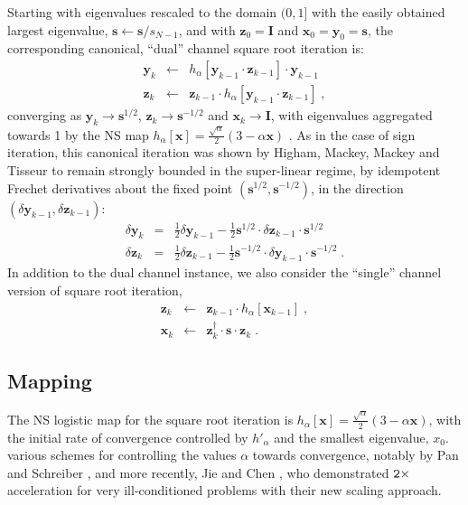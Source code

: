 \documentclass[letterpaper,twocolumn,amsmath,amsfont,amssymb,english,aps,jcp,preprintnumbers,groupaddress,nofootinbib,tightenlines,floatfix]{revtex4}
\newcommand{\mat}[1]{\boldsymbol{#1}}
\theoremstyle{plain}
\theoremstyle{remark}
\theoremstyle{plain}
\begin{document}
Starting with eigenvalues rescaled to the domain $(0,1]$ with the easily obtained 
largest eigenvalue,   $\mat{s} \leftarrow \mat{s}/s_{N-1}$, and with $\mat{z}_0=\mat{I}$ and 
$\mat{x}_0=\mat{y}_0=\mat{s}$, the corresponding canonical,  ``dual'' channel square root iteration is:
\begin{eqnarray}\label{cannonical}
\mat{y}_k &\leftarrow& h_\alpha \left[ \mat{y}_{k-1} \cdot \mat{z}_{k-1} \right] \cdot \mat{y}_{k-1}  \nonumber \\
\mat{z}_k &\leftarrow& \mat{z}_{k-1} \cdot h_\alpha \left[ \mat{y}_{k-1} \cdot \mat{z}_{k-1} \right] \; ,
\end{eqnarray}
converging as ${\mat{y}}_k \rightarrow \mat{s}^{1/2}$, ${\mat{z}}_k \rightarrow \mat{s}^{-1/2}$ and
${\mat{x}}_k \rightarrow {\mat{I}}$, with eigenvalues aggregated towards 1 by 
the NS map $h_\alpha[\mat{x}]=\frac{\sqrt{\alpha}}{2} \left(3-\alpha \mat{x} \right)$ \cite{Higham08,higham2005}.  
As in the case of sign iteration, this canonical iteration was shown by Higham, Mackey, Mackey and
Tisseur \cite{higham2005} to remain strongly bounded in the super-linear regime, by idempotent Frechet derivatives about the fixed point
$\left(\mat{s}^{1/2},\mat{s}^{-1/2}\right)$, in the direction $\left(
\delta \mat{y}_{k-1} , \delta \mat{z}_{k-1} \right)$:
\begin{eqnarray}
\delta \mat{y}_k &=& \frac{1}{2} \delta \mat{y}_{k-1} - \frac{1}{2} \mat{s}^{1/2} \cdot \delta \mat{z}_{k-1} \cdot \mat{s}^{1/2} \\
\delta \mat{z}_k &=& \frac{1}{2} \delta \mat{z}_{k-1} - \frac{1}{2} \mat{s}^{-1/2} \cdot \delta \mat{y}_{k-1} \cdot \mat{s}^{-1/2} \;.
\end{eqnarray}
In addition to the dual channel instance, we also consider the ``single'' channel version of square root iteration,
\begin{eqnarray}\label{single}
\mat{z}_k &\leftarrow& \mat{z}_{k-1} \cdot h_\alpha \left[ \mat{x}_{k-1} \right] \; , \nonumber \\
\mat{x}_k &\leftarrow&  \mat{z}^\dagger_{k} \cdot \mat{s} \cdot \mat{z}_{k} \; .
\end{eqnarray}

\subsection{Mapping}\label{map}
The NS logistic map for the square root iteration is $h_\alpha[\mat{x}]=\frac{\sqrt{\alpha}}{2} \left(3-\alpha \mat{x} \right)$, 
with the initial rate of convergence controlled by $h'_\alpha$ and the smallest eigenvalue, $x_0$. 
various schemes for controlling the values $\alpha$ towards convergence, 
notably  by Pan and Schreiber \cite{Pan1991}, and more recently, Jie and Chen \cite{chen2014}, who demonstrated  $\tt 2 \times$
acceleration for very ill-conditioned problems with their new scaling approach. 
\end{document}
